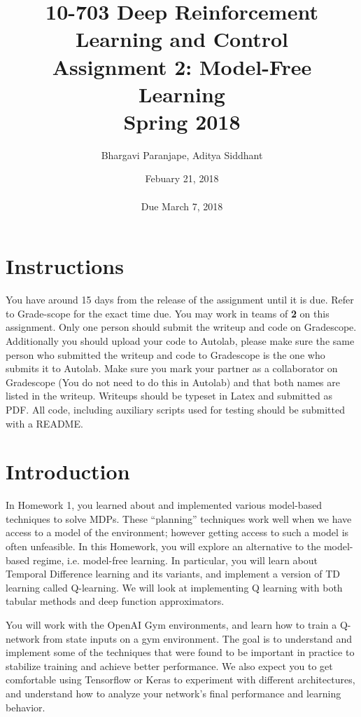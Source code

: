 \documentclass[12pt]{article}
\title{10-703 Deep Reinforcement Learning and Control\\
  Assignment 2: Model-Free Learning\\
  Spring 2018\\
}
\author{Bhargavi Paranjape, Aditya Siddhant}
\date{Febuary 21, 2018\\
  \hspace{1cm}\\
Due March 7, 2018}
\begin{document}
\maketitle

\section*{Instructions}

You have around 15 days from the release of the assignment until it is due. Refer to Grade-scope for the exact time due.  You may work in teams of \textbf{2} on this assignment. Only one person should submit the writeup and code on Gradescope. Additionally you should upload your code to Autolab, please make sure the same person who submitted the writeup and code to Gradescope is the one who submits it to Autolab.  Make sure you mark your partner as a collaborator on Gradescope (You do not need to do this in Autolab) and that both names are listed in the writeup.  Writeups should be typeset in Latex and submitted as PDF. All code, including auxiliary scripts used for testing should be
submitted with a README.

\section*{Introduction}

In Homework 1, you learned about and implemented various model-based techniques to solve MDPs. These ``planning'' techniques work well when we have access to a model of the environment; however getting access to such a model is often unfeasible. In this Homework, you will explore an alternative to the model-based regime, i.e. model-free learning. 
In particular, you will learn about Temporal Difference learning and its variants, and implement a version of TD learning called Q-learning. We will look at implementing Q learning with both tabular methods and deep function approximators. 

You will work with the OpenAI Gym environments, and learn how to train a Q-network from state inputs on a gym environment. The goal is to understand and implement some of the techniques that were found to be important in practice to stabilize training and achieve better performance. We also expect you to get comfortable using Tensorflow or Keras to experiment with different architectures, and understand how to analyze your network's final performance and learning behavior. 
\end{document}
